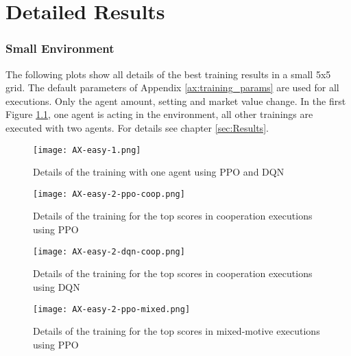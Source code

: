 \chapter{Detailed Results}\label{ax:plots}

\subsection{Small Environment}
The following plots show all details of the best training results in a small 5x5 grid. The default parameters of Appendix \ref{ax:training_params} are used for all executions. Only the agent amount, setting and market value change. In the first Figure \ref{fig:ax-easy-1}, one agent is acting in the environment, all other trainings are executed with two agents. For details see chapter \ref{sec:Results}.

\begin{figure}[hpbt]
    \centering
    \texttt{[image: AX-easy-1.png]}\\
    \caption[PPO and DQN Training Details with One Agent]{Details of the training with one agent using PPO and DQN}\label{fig:ax-easy-1}
\end{figure}

\begin{figure}[hpbt]
    \centering
    \texttt{[image: AX-easy-2-ppo-coop.png]}\\
    \caption[Training Details of Top PPO Cooperation Executions]{Details of the training for the top scores in cooperation executions using PPO}\label{fig:ax-easy-2-ppo-coop}
\end{figure}

\begin{figure}[hpbt]
    \centering
    \texttt{[image: AX-easy-2-dqn-coop.png]}\\
    \caption[Training Details of Top DQN Cooperation Executions]{Details of the training for the top scores in cooperation executions using DQN}\label{fig:ax-easy-2-dqn-coop}
\end{figure}

\begin{figure}[hpbt]
    \centering
    \texttt{[image: AX-easy-2-ppo-mixed.png]}\\
    \caption[Training Details of Top PPO Mixed-Motive Executions]{Details of the training for the top scores in mixed-motive executions using PPO}\label{fig:ax-easy-2-ppo-mixed}
\end{figure}

